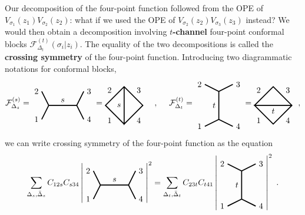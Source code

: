 \documentclass[12pt, a4paper, notitlepage, twoside]{report}
\numberwithin{equation}{section}
\theoremstyle{break}
\begin{document}
Our decomposition of the four-point function followed from the OPE of $V_{\sigma_1}(z_1)V_{\sigma_2}(z_2)$: what if we used the OPE of $V_{\sigma_2}(z_2)V_{\sigma_3}(z_3)$ instead? We would then obtain a decomposition involving \textbf{\boldmath $t$-channel} four-point conformal blocks  $\mathcal{F}^{(t)}_{\Delta_t}(\sigma_i|z_i)$.
The equality of the two decompositions is called the \textbf{\boldmath crossing symmetry} of the four-point function.
Introducing two diagrammatic notations for conformal blocks, 
\begin{align}
 \mathcal{F}^{(s)}_{\Delta_s}  =  
\begin{tikzpicture}[baseline=(current  bounding  box.center), very thick, scale = .3]
\draw (-1,2) node [left] {$2$} -- (0,0) -- node [above] {$s$} (4,0) -- (5,2) node [right] {$3$};
\draw (-1,-2) node [left] {$1$} -- (0,0);
\draw (4,0) -- (5,-2) node [right] {$4$};
\end{tikzpicture}
=
\begin{tikzpicture}[baseline=(current  bounding  box.center), very thick, scale = .4]
\draw (0, -2) -- node [below left] {$1$} (-2, 0) -- node [above left] {$2$} (0, 2) -- node [above right] {$3$} (2, 0) -- node [below right] {$4$} (0, -2) -- node [left] {$s$} (0, 2); 
\end{tikzpicture}
\quad\ ,\quad\
 \mathcal{F}^{(t)}_{\Delta_t}  =  
\begin{tikzpicture}[baseline=(current  bounding  box.center), very thick, scale = .3]
 \draw (-2,3) node [left] {$2$} -- (0,2) -- node [left] {$t$} (0,-2) -- (-2, -3) node [left] {$1$};
\draw (0,2) -- (2,3) node [right] {$3$};
\draw (0,-2) -- (2, -3) node [right] {$4$};
\end{tikzpicture}
=
\begin{tikzpicture}[baseline=(current  bounding  box.center), very thick, scale = .4]
\draw (-2, 0) -- node [above left] {$2$} (0, 2) -- node [above right] {$3$} (2, 0) -- node [below right] {$4$} (0, -2) -- node [below left] {$1$} (-2, 0) -- node [below] {$t$} (2, 0); 
\end{tikzpicture}
\ \ ,
\end{align}
we can write crossing symmetry of the four-point function as the equation
\begin{align}
 \sum_{\Delta_s,\bar{\Delta}_s} C_{12s} C_{s34} \left| 
 \begin{tikzpicture}[baseline=(current  bounding  box.center), very thick, scale = .3]
\draw (-1,2) node [left] {$2$} -- (0,0) -- node [above] {$s$} (4,0) -- (5,2) node [right] {$3$};
\draw (-1,-2) node [left] {$1$} -- (0,0);
\draw (4,0) -- (5,-2) node [right] {$4$};
\end{tikzpicture} 
\right|^2 = \sum_{\Delta_t,\bar{\Delta}_t} C_{23t}C_{t41} \left|
\begin{tikzpicture}[baseline=(current  bounding  box.center), very thick, scale = .3]
 \draw (-2,3) node [left] {$2$} -- (0,2) -- node [left] {$t$} (0,-2) -- (-2, -3) node [left] {$1$};
\draw (0,2) -- (2,3) node [right] {$3$};
\draw (0,-2) -- (2, -3) node [right] {$4$};
\end{tikzpicture}
\right|^2\ .
\label{csd}
\end{align}
\end{document}
